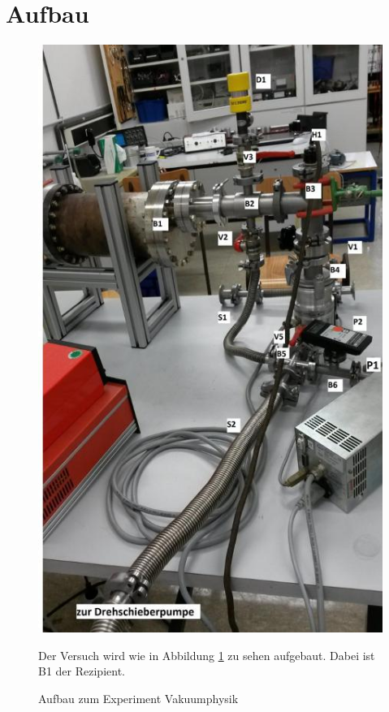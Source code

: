 \section{Aufbau}
\label{sec:Aufbau}

\begin{figure}
\begin{minipage}{0.48\textwidth}
\includegraphics[scale=0.45]{content/images/Aufbau.jpg}
\caption{Aufbau zum Experiment Vakuumphysik\cite{V70}}
\label{fig:Aufbau}
\end{minipage}
\hfil
\begin{minipage}{0.42\textwidth}
Der Versuch wird wie in Abbildung \ref{fig:Aufbau} zu sehen aufgebaut. Dabei ist B1 der Rezipient.
\end{minipage}
\end{figure}
